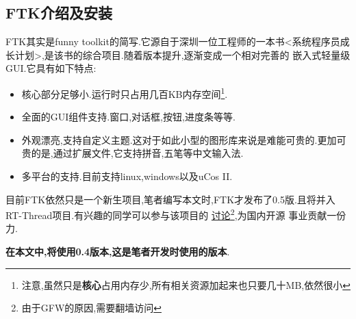 \documentclass[12pt,a4paper,titlepage]{article}
\begin{document}
\subsection{FTK介绍及安装}
FTK其实是funny toolkit的简写.它源自于深圳一位工程师的一本书<系统程序员成长计划>,是该书的综合项目.随着版本提升,逐渐变成一个相对完善的
嵌入式轻量级GUI.它具有如下特点:
\begin{itemize}
\item 核心部分足够小.运行时只占用几百KB内存空间\footnote{注意,虽然只是\textbf{核心}占用内存少,所有相关资源加起来也只要几十MB,依然很小}.
\item 全面的GUI组件支持.窗口,对话框,按钮,进度条等等.
\item 外观漂亮,支持自定义主题.这对于如此小型的图形库来说是难能可贵的.更加可贵的是,通过扩展文件,它支持拼音,五笔等中文输入法.
\item 多平台的支持.目前支持linux,windows以及uCos II.
\end{itemize}
目前FTK依然只是一个新生项目,笔者编写本文时,FTK才发布了0.5版.且将并入RT-Thread项目.有兴趣的同学可以参与该项目的
\href{https://groups.google.com/group/funnytoolkit}{讨论}\footnote{由于GFW的原因,需要翻墙访问},为国内开源
事业贡献一份力.

\textbf{在本文中,将使用0.4版本,这是笔者开发时使用的版本}.
\end{document}

